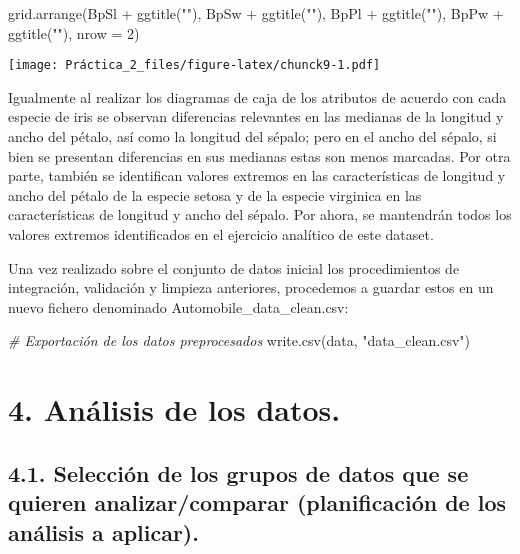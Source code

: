 \documentclass[
]{article}
\newenvironment{Shaded}{\begin{snugshade}}{\end{snugshade}}
\newcommand{\AttributeTok}[1]{\textcolor[rgb]{0.77,0.63,0.00}{#1}}
\newcommand{\CommentTok}[1]{\textcolor[rgb]{0.56,0.35,0.01}{\textit{#1}}}
\newcommand{\DecValTok}[1]{\textcolor[rgb]{0.00,0.00,0.81}{#1}}
\newcommand{\FunctionTok}[1]{\textcolor[rgb]{0.00,0.00,0.00}{#1}}
\newcommand{\NormalTok}[1]{#1}
\newcommand{\SpecialCharTok}[1]{\textcolor[rgb]{0.00,0.00,0.00}{#1}}
\newcommand{\StringTok}[1]{\textcolor[rgb]{0.31,0.60,0.02}{#1}}
\begin{document}
\begin{Shaded}
\begin{Highlighting}[]
\FunctionTok{grid.arrange}\NormalTok{(BpSl  }\SpecialCharTok{+} \FunctionTok{ggtitle}\NormalTok{(}\StringTok{""}\NormalTok{),}
\NormalTok{             BpSw  }\SpecialCharTok{+} \FunctionTok{ggtitle}\NormalTok{(}\StringTok{""}\NormalTok{),}
\NormalTok{             BpPl }\SpecialCharTok{+} \FunctionTok{ggtitle}\NormalTok{(}\StringTok{""}\NormalTok{),}
\NormalTok{             BpPw }\SpecialCharTok{+} \FunctionTok{ggtitle}\NormalTok{(}\StringTok{""}\NormalTok{),}
             \AttributeTok{nrow =} \DecValTok{2}\NormalTok{)}
\end{Highlighting}
\end{Shaded}

\texttt{[image: Práctica\_2\_files/figure-latex/chunck9-1.pdf]}

Igualmente al realizar los diagramas de caja de los atributos de acuerdo
con cada especie de iris se observan diferencias relevantes en las
medianas de la longitud y ancho del pétalo, así como la longitud del
sépalo; pero en el ancho del sépalo, si bien se presentan diferencias en
sus medianas estas son menos marcadas. Por otra parte, también se
identifican valores extremos en las características de longitud y ancho
del pétalo de la especie setosa y de la especie virginica en las
características de longitud y ancho del sépalo. Por ahora, se mantendrán
todos los valores extremos identificados en el ejercicio analítico de
este dataset.

Una vez realizado sobre el conjunto de datos inicial los procedimientos
de integración, validación y limpieza anteriores, procedemos a guardar
estos en un nuevo fichero denominado Automobile\_data\_clean.csv:

\begin{Shaded}
\begin{Highlighting}[]
\CommentTok{\# Exportación de los datos preprocesados}
\FunctionTok{write.csv}\NormalTok{(data, }\StringTok{"data\_clean.csv"}\NormalTok{)}
\end{Highlighting}
\end{Shaded}

\hypertarget{anuxe1lisis-de-los-datos.}{%
\section{4. Análisis de los datos.}\label{anuxe1lisis-de-los-datos.}}

\hypertarget{selecciuxf3n-de-los-grupos-de-datos-que-se-quieren-analizarcomparar-planificaciuxf3n-de-los-anuxe1lisis-a-aplicar.}{%
\subsection{4.1. Selección de los grupos de datos que se quieren
analizar/comparar (planificación de los análisis a
aplicar).}\label{selecciuxf3n-de-los-grupos-de-datos-que-se-quieren-analizarcomparar-planificaciuxf3n-de-los-anuxe1lisis-a-aplicar.}}
\end{document}
